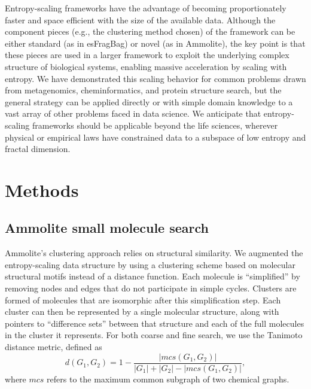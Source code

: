 \documentclass[11pt]{elsarticle}
\theoremstyle{definition}
\theoremstyle{remark}
\numberwithin{equation}{section}
\begin{document}
Entropy-scaling frameworks have the advantage of becoming proportionately faster and space efficient with the size of the available data.
Although the component pieces (e.g., the clustering method chosen) of the framework can be either standard (as in esFragBag) or novel (as in Ammolite), the key point is that these pieces are used in a larger framework to exploit the underlying complex structure of biological systems, enabling massive acceleration by scaling with entropy.
We have demonstrated this scaling behavior for common problems drawn from metagenomics, cheminformatics, and protein structure search, but the general strategy can be applied directly or with simple domain knowledge to a vast array of other problems faced in data science.
We anticipate that entropy-scaling frameworks should be applicable beyond the life sciences, wherever physical or empirical laws have constrained data to a subspace of low entropy and fractal dimension.

\section{Methods}

\subsection{Ammolite small molecule search}
Ammolite's clustering approach relies on structural similarity.
We augmented the entropy-scaling data structure by using a clustering scheme based on molecular structural motifs instead of a distance function.
Each molecule is ``simplified'' by removing nodes and edges that do not
participate in simple cycles.
Clusters are formed of molecules that are isomorphic after this simplification
step.
Each cluster can then be represented by a single molecular structure, along 
with pointers to ``difference sets''  between that structure and each of the 
full molecules in the cluster it represents.
For both coarse and fine search, we use the Tanimoto distance metric, defined as
\[d(G_1,G_2) = 1 - \frac{ |mcs(G_1,G_2)| }{|G_1|+|G_2|-|mcs(G_1,G_2)|},\]
where $mcs$ refers to the maximum common subgraph of two chemical graphs. 
\end{document}
